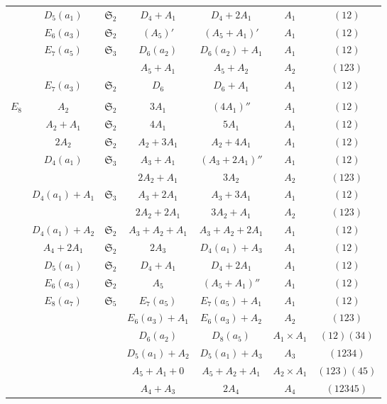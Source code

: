 \documentclass{amsart}
\theoremstyle{definition}
\newcommand{\frakS}{\mathfrak{S}}
\newcommand{\0}{\mathcal{O}}
\begin{document}
\begin{table}
\begin{center}
\begin{tabular}{|c | c| c|c |c| c| c|}
				& $D_5(a_1)$ & $\frakS_2$ & $D_4+A_1$ & $D_4+2A_1$  &  $A_1$ & $(12)$\\  

                & $E_6(a_3)$ & $\frakS_2$ & $(A_5)'$ & $(A_5+A_1)'$ &  $A_1$ & $(12)$\\  
                 & $E_7(a_5)$ &  $\frakS_3$ & $D_6(a_2)$ & $D_6(a_2)+A_1$ &  $A_1$ & $(12)$\\  
                    &  &  & $A_5+A_1$ & $A_5+A_2$ &  $A_2$ & $(123)$\\  
                & $E_7(a_3)$ &  $\frakS_2$ & $D_6$ & $D_6+A_1$ &  $A_1$ & $(12)$\\  
				\hline & & & & & &  \\[-0.3cm]
				
				$E_8$ 
				& $A_2$ & $\frakS_2$ & $3A_1$ & $(4A_1)''$ &  $A_1$ & $(12)$\\

                & $A_2+A_1$ & $\frakS_2$ & $4A_1$ & $5A_1$ & $A_1$ & $(12)$\\
                    
				& $2A_2$ & $\frakS_2$ & $A_2+3A_1$ & $A_2+4A_1$	&  $A_1$ & $(12)$\\		
                   & $D_4(a_1)$ & $\frakS_3$ & $A_3+A_1$ & $(A_3+2A_1)''$ &  $A_1$ & $(12)$\\  
                      & & & $2A_2+A_1$ & $3A_2$ &  $A_2$ & $(123)$\\   
                   & $D_4(a_1)+A_1$ & $\frakS_3$ & $A_3+2A_1$ & $A_3+3A_1$ &  $A_1$ & $(12)$\\  
                      & & & $2A_2+2A_1$ & $3A_2+A_1$ &  $A_2$ & $(123)$\\  
				& $D_4(a_1)+A_2$ & $\frakS_2$ & $A_3{+}A_2{+}A_1$ & $A_3{+}A_2{+}2A_1$ &  $A_1$ & $(12)$\\

	           & $A_4+2A_1$ & $\frakS_2$ & $2A_3$ & $D_4(a_1)+A_3$ & $A_1$ & $(12)$\\
                & $D_5(a_1)$ & $\frakS_2$ & $D_4+A_1$ & $D_4+2A_1$  &  $A_1$ & $(12)$\\  
                & $E_6(a_3)$ & $\frakS_2$ & $A_5$ & $(A_5+A_1)''$ &  $A_1$ & $(12)$\\
                 & $E_8(a_7)$ &  $\frakS_5$ & $E_7(a_5)$ & $E_7(a_5)+A_1$ &  $A_1$ & $(12)$\\  
                    &  &  & $E_6(a_3)+A_1$ & $E_6(a_3)+A_2$ &  $A_2$ & $(123)$\\ 
                    &  &  & $D_6(a_2)$ & $D_8(a_5)$ &  $A_1 \times A_1$ & $(12)(34)$\\ 
                    &  &   & $D_5(a_1)+A_2$ & $D_5(a_1)+A_3$ &  $A_3$ & $(1234)$\\ 
                    &  &   & $A_5+A_1+0$ & $A_5+A_2+A_1$&  $A_2 \times A_1$ & $(123)(45)$\\ 
                    &  &   & $A_4+A_3$ & $2A_4$  &  $A_4$ & $(12345)$\\ 
				  			

\end{tabular}
\end{center}
\end{table}
\end{document}
